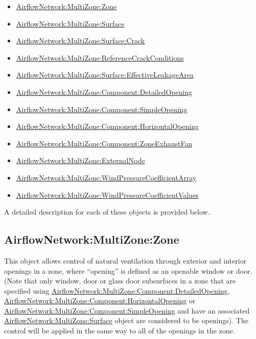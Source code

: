 \begin{itemize}
\item
  \hyperref[airflownetworkmultizonezone]{AirflowNetwork:MultiZone:Zone}
\item
  \hyperref[airflownetworkmultizonesurface]{AirflowNetwork:MultiZone:Surface}
\item
  \hyperref[airflownetworkmultizonesurfacecrack]{AirflowNetwork:MultiZone:Surface:Crack}
\item
  \hyperref[airflownetworkmultizonereferencecrackconditions]{AirflowNetwork:MultiZone:ReferenceCrackConditions}
\item
  \hyperref[airflownetworkmultizonesurfaceeffectiveleakagearea]{AirflowNetwork:MultiZone:Surface:EffectiveLeakageArea}
\item
  \hyperref[airflownetworkmultizonecomponentdetailedopening]{AirflowNetwork:MultiZone:Component:DetailedOpening}
\item
  \hyperref[airflownetworkmultizonecomponentsimpleopening]{AirflowNetwork:MultiZone:Component:SimpleOpening}
\item
  \hyperref[airflownetworkmultizonecomponenthorizontalopening]{AirflowNetwork:MultiZone:Component:HorizontalOpening}
\item
  \hyperref[airflownetworkmultizonecomponentzoneexhaustfan]{AirflowNetwork:MultiZone:Component:ZoneExhaustFan}
\item
  \hyperref[airflownetworkmultizoneexternalnode]{AirflowNetwork:MultiZone:ExternalNode}
\item
  \hyperref[airflownetworkmultizonewindpressurecoefficientarray]{AirflowNetwork:MultiZone:WindPressureCoefficientArray}
\item
  \hyperref[airflownetworkmultizonewindpressurecoefficientvalues]{AirflowNetwork:MultiZone:WindPressureCoefficientValues}
\end{itemize}

A detailed description for each of these objects is provided below.

\subsection{AirflowNetwork:MultiZone:Zone}\label{airflownetworkmultizonezone}

This object allows control of natural ventilation through exterior and interior openings in a zone, where ``opening'' is defined as an openable window or door. (Note that only window, door or glass door subsurfaces in a zone that are specified using \hyperref[airflownetworkmultizonecomponentdetailedopening]{AirflowNetwork:MultiZone:Component:DetailedOpening}, \hyperref[airflownetworkmultizonecomponenthorizontalopening]{AirflowNetwork:MultiZone:Component:HorizontalOpening} or \hyperref[airflownetworkmultizonecomponentsimpleopening]{AirflowNetwork:MultiZone:Component:SimpleOpening} and have an associated \hyperref[airflownetworkmultizonesurface]{AirflowNetwork:MultiZone:Surface} object are considered to be openings). The control will be applied in the same way to all of the openings in the zone.

